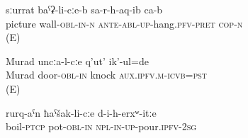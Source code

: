 \begin{exe} 
	\ex	\label{ex:pic on wall_2}
	\gll	sːurrat baˁʡ-li-cːe-b sa-r-h-aq-ib ca-b\\
picture	wall-\textsc{obl-in-n}	\textsc{ante-abl-up}-hang.\textsc{pfv-pret}	\textsc{cop-n} \\
	\glt	{} (E)
	
		\ex	\label{Murad knocked at the door.}
	\gll	Murad uncːa-l-cːe q'ut' ik'-ul=de\\
 Murad door-\textsc{obl-in} knock \textsc{aux.ipfv.m-icvb=pst}\\
	\glt	{} (E)
	
			\ex	\label{You pour (them) into a pot with boiling (water).}
	\gll	rurq-aˁn ħaˁšak-li-cːe d-i-h-erxʷ-itːe \\
boil-\textsc{ptcp}	pot-\textsc{obl-in}	\textsc{npl-in-up}-pour.\textsc{ipfv-2sg} \\
	\glt	{} 
	
\end{exe}

